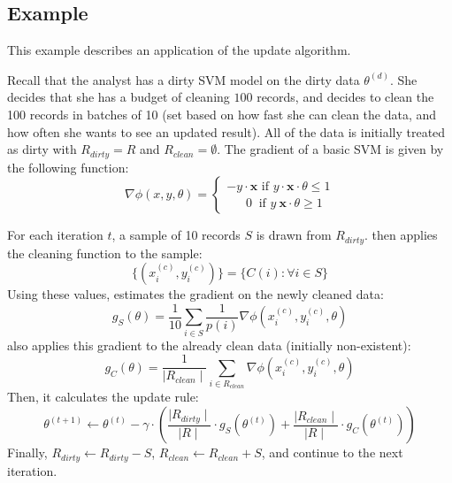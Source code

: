 \subsection{Example}
This example describes an application of the update algorithm.
\begin{example}\label{upex}
Recall that the analyst has a dirty SVM model on the dirty data $\theta^{(d)}$.
She decides that she has a budget of cleaning $100$ records, and decides to clean the 100 records in batches of 10 (set based on how fast she can clean the data, and how often she wants to see an updated result).
All of the data is initially treated as dirty with $R_{dirty} = R$ and $R_{clean} = \emptyset$.
The gradient of a basic SVM is given by the following function:
\[
\nabla\phi(x,y,\theta) =
\begin{cases}      
-y\cdot\boldsymbol{x} \text{ if } y\cdot\boldsymbol{x}\cdot\theta \le 1 \\
~~~~~~~0\ \text{ if } y\ \boldsymbol{x}\cdot\theta \geq 1      
\end{cases}
\]

For each iteration $t$, a sample of 10 records $S$ is drawn from $R_{dirty}$.
\sys then applies the cleaning function to the sample:
\[
\{(x_i^{(c)},y_i^{(c)})\} = \{C(i): \forall i \in S\}
\]
Using these values, \sys estimates the gradient on the newly cleaned data:
\[
g_{S}(\theta) = \frac{1}{10} \sum_{i \in S}\frac{1}{p(i)}\nabla\phi(x_i^{(c)},y_i^{(c)},\theta)
\]
\sys also applies this gradient to the already clean data (initially non-existent):
\[
g_C(\theta) = \frac{1}{\mid R_{clean}\mid}\sum_{i \in R_{clean}}\nabla\phi(x_i^{(c)},y_i^{(c)},\theta)
\]
Then, it calculates the update rule:
\[
	\theta^{(t+1)} \leftarrow \theta^{(t)} - \gamma \cdot(\frac{\mid R_{dirty} \mid}{\mid R \mid} \cdot g_S(\theta^{(t)}) + \frac{\mid R_{clean} \mid}{\mid R \mid} \cdot  g_C(\theta^{(t)}))
\] 
Finally, $R_{dirty} \leftarrow R_{dirty} - S$, $R_{clean} \leftarrow R_{clean} + S$, and continue to the next iteration.
\end{example}
